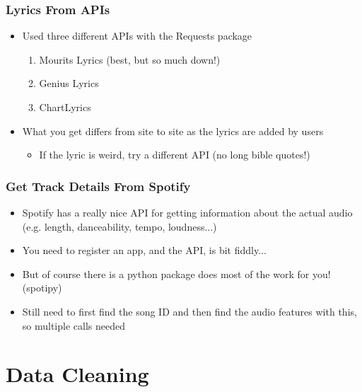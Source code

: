 \documentclass[10pt]{beamer}
\begin{document}
\begin{frame}
\frametitle{Lyrics From APIs}

\begin{itemize}
    \item Used three different APIs with the Requests package
    \begin{enumerate}
        \item Mourits Lyrics (best, but so much down!)
        \item Genius Lyrics
        \item ChartLyrics
    \pause
    \end{enumerate}
    \item What you get differs from site to site as the lyrics are added by users
    \begin{itemize}
        \item If the lyric is weird, try a different API (no long bible quotes!)
    \end{itemize}
\end{itemize}

\end{frame}

\begin{frame}
\frametitle{Get Track Details From Spotify}

\begin{itemize}
    \item Spotify has a really nice API for getting information about
    the actual audio (e.g. length, danceability, tempo, loudness...)
    \pause
    \item You need to register an app, and the API, is bit fiddly...
    \pause
    \item But of course there is a python package does most of the work
    for you! (spotipy)
    \pause
    \item Still need to first find the song ID and then find the audio features
    with this, so multiple calls needed
\end{itemize}

\end{frame}

\section{Data Cleaning}
\end{document}
